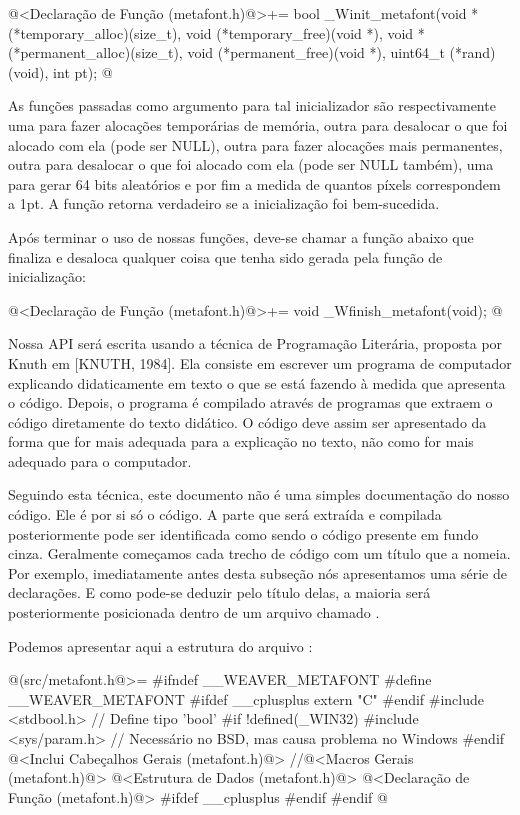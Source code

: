 \iniciocodigo
@<Declaração de Função (metafont.h)@>+=
bool _Winit_metafont(void *(*temporary_alloc)(size_t),
                     void (*temporary_free)(void *),
                     void *(*permanent_alloc)(size_t),
                     void (*permanent_free)(void *),
                     uint64_t (*rand)(void), int pt);
@
\fimcodigo

As funções passadas como argumento para tal inicializador são
respectivamente uma para fazer alocações temporárias de memória, outra
para desalocar o que foi alocado com ela (pode ser NULL), outra para
fazer alocações mais permanentes, outra para desalocar o que foi
alocado com ela (pode ser NULL também), uma para gerar 64 bits
aleatórios e por fim a medida de quantos píxels correspondem a 1pt. A
função retorna verdadeiro se a inicialização foi bem-sucedida.

Após terminar o uso de nossas funções, deve-se chamar a função abaixo
que finaliza e desaloca qualquer coisa que tenha sido gerada pela
função de inicialização:

\iniciocodigo
@<Declaração de Função (metafont.h)@>+=
void _Wfinish_metafont(void);
@
\fimcodigo




Nossa API será escrita usando a técnica de Programação Literária,
proposta por Knuth em [KNUTH, 1984]. Ela consiste em escrever um
programa de computador explicando didaticamente em texto o que se está
fazendo à medida que apresenta o código. Depois, o programa é
compilado através de programas que extraem o código diretamente do
texto didático. O código deve assim ser apresentado da forma que for
mais adequada para a explicação no texto, não como for mais adequado
para o computador.

Seguindo esta técnica, este documento não é uma simples documentação
do nosso código. Ele é por si só o código. A parte que será extraída e
compilada posteriormente pode ser identificada como sendo o código
presente em fundo cinza. Geralmente começamos cada trecho de código
com um título que a nomeia. Por exemplo, imediatamente antes desta
subseção nós apresentamos uma série de declarações. E como pode-se
deduzir pelo título delas, a maioria será posteriormente posicionada
dentro de um arquivo chamado .

Podemos apresentar aqui a estrutura do arquivo
:

\iniciocodigo
@(src/metafont.h@>=
#ifndef __WEAVER_METAFONT
#define __WEAVER_METAFONT
#ifdef __cplusplus
extern "C" {
#endif
#include <stdbool.h> // Define tipo 'bool'
#if !defined(_WIN32)
#include <sys/param.h> // Necessário no BSD, mas causa problema no Windows
#endif
@<Inclui Cabeçalhos Gerais (metafont.h)@>
//@<Macros Gerais (metafont.h)@>
@<Estrutura de Dados (metafont.h)@>
@<Declaração de Função (metafont.h)@>
#ifdef __cplusplus
}
#endif
#endif
@
\fimcodigo

